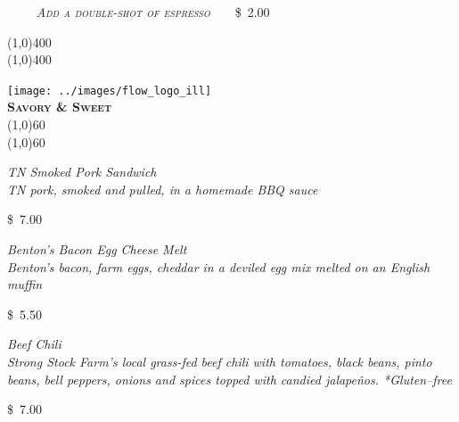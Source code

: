 \documentclass[letterpaper, 12pt]{article}%
\newcommand{\ill}{
\texttt{[image: ../images/flow\_logo\_ill]}
}
\newcommand{\menuentry}[2]{
 \emph{\footnotesize#1}\\
 \vspace*{\fill}
 {\small#2}
}
\newcommand{\menuitem}[4]{
 \centering
  \ill\\
  \smallskip\vspace{0.1em}
  \textbf{\sffamily \textsc{\large#2}}\vspace{-1ex}\\
  \line(1,0){#1}\vspace{-2ex}\\
  \line(1,0){#1}\vspace{0.5ex}\\
  \smallskip
  \menuentry{#3}{#4}
}
\newcommand{\flowtherefore}{~~\raisebox{0.2ex}{$\therefore$}~~}
\newcommand{\price}[2]{
 \textsc{\small#1}\flowtherefore\$~\textsc{\small#2}
}
\newcommand{\varprice}[1]{
 \$~\textsc{\small#1}
}
\newcommand{\heading}[1]{{\large\bfseries #1\par}}
\newcommand{\flowentry}[1]{
{\calligra\centering\heading{\Huge #1}\vspace{-2ex}

\line(1,0){400}\vspace{-3ex}\\
\line(1,0){400}\vspace{-2ex}

}}
\begin{document}

\vspace{0.5em}
{\centering
 \textbf{\textup{\normalsize{}}}\flowtherefore\price{\textrm{\emph{\normalsize Add a double-shot of espresso}}}{2.00}

}

\flowentry{}


\newlength{\ssminihi}
\newlength{\ssminiwi}
\newlength{\ocminiwi}
\setlength{\ssminihi}{0.32\textwidth}
\setlength{\ssminiwi}{0.57\textwidth}
\setlength{\ocminiwi}{0.15\textwidth}

{\centering
\begin{minipage}{0.5\textwidth}
{\centering
\begin{minipage}[t][\ssminihi][b]{\ssminiwi}
 \centering
 \menuitem{60}{
  Savory \& Sweet}{
  \textup{\normalsize TN Smoked Pork Sandwich}\\
  TN pork, smoked and pulled, in a homemade BBQ sauce
  }{
  \varprice{7.00}
 }

\vspace{1em}

\menuentry{
  \textup{\normalsize Benton's Bacon Egg Cheese Melt}\\
  Benton's bacon, farm eggs, cheddar in a deviled egg mix melted on an English muffin
  }{
  \varprice{5.50}
}

\vspace{1em}

\menuentry{
 \textup{\normalsize Beef Chili}\\
 Strong Stock Farm's local grass-fed beef chili with tomatoes, black beans, pinto beans, bell peppers, onions and spices topped with candied jalape\~{n}os. *Gluten--free
 }{
 \varprice{7.00}
}
\end{minipage}



}
\end{minipage}}
\end{document}
